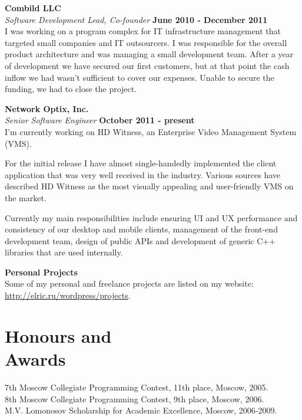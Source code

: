 \documentclass[margin,line]{CV}
\begin{document}
\begin{resume}
	\textbf{Combild LLC} \vspace{2mm}\\\vspace{1mm}%
	\textsl{Software Development Lead, Co-founder} \hfill \textbf{June 2010 - December 2011}\\
    I was working on a program complex for IT infrastructure management that targeted small companies and IT outsourcers. I was responsible for the overall product architecture and was managing a small development team. After a year of development we have secured our first customers, but at that point the cash inflow we had wasn't sufficient to cover our expenses. Unable to secure the funding, we had to close the project.

    \textbf{Network Optix, Inc.} \vspace{2mm}\\\vspace{1mm}%
    \textsl{Senior Software Engineer} \hfill \textbf{October 2011 - present}\\
    I'm currently working on HD Witness, an Enterprise Video Management System (VMS). 
    
    For the initial release I have almost single-handedly implemented the client application that was very well received in the industry. Various sources have described HD Witness as the most visually appealing and user-friendly VMS on the market. 
    
    Currently my main responsibilities include ensuring UI and UX performance and consistency of our desktop and mobile clients, management of the front-end development team, design of public APIs and development of generic C++ libraries that are used internally.
    
	\textbf{Personal Projects} \vspace{2mm}\\\vspace{1mm}%
	Some of my personal and freelance projects are listed on my website: \url{http://elric.ru/wordpress/projects}.

    \pagebreak
    
    \section{\mysidestyle Honours and\\Awards}
    7th Moscow Collegiate Programming Contest, 11th place, Moscow, 2005.                            \vspace{1mm}\\%
    8th Moscow Collegiate Programming Contest, 9th place, Moscow, 2006.                             \vspace{1mm}\\%
    M.V. Lomonosov Scholarship for Academic Excellence, Moscow, 2006-2009.



\end{resume}
\end{document}

